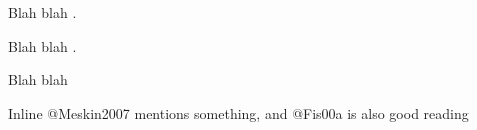 Blah blah \citetext{\citealp[see][pp. 33-35]{Fis00a}, \citealp[also][ch. 1]{Meskin2007}}.

Blah blah \citetext{\citealp[][pp. 33-35, 38-39]{Fis00a} and \emph{passim}}.

Blah blah \citetext{\citealp[][]{Meskin2007}, \citealp[][]{Fis00a}}

Inline @Meskin2007 mentions something, and @Fis00a is also good reading

